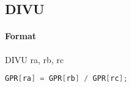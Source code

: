 \subsection{DIVU}


\paragraph{Format} DIVU ra, rb, rc

\begin{lstlisting}[language=C]
    GPR[ra] = GPR[rb] / GPR[rc];
\end{lstlisting}